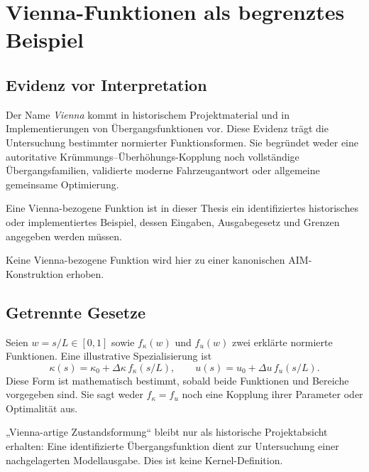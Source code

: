 \chapter{Vienna-Funktionen als begrenztes Beispiel}
\label{chap:vienna-reinterpretation}

\section*{Evidenz vor Interpretation}

Der Name \emph{Vienna} kommt in historischem Projektmaterial und in
Implementierungen von Übergangsfunktionen vor. Diese Evidenz trägt die
Untersuchung bestimmter normierter Funktionsformen. Sie begründet weder eine
autoritative Krümmungs--Überhöhungs-Kopplung noch vollständige
Übergangsfamilien, validierte moderne Fahrzeugantwort oder allgemeine
gemeinsame Optimierung.

\begin{principle}
\label{princ:vienna-reinterpretation}
Eine Vienna-bezogene Funktion ist in dieser Thesis ein identifiziertes
historisches oder implementiertes Beispiel, dessen Eingaben, Ausgabegesetz
und Grenzen angegeben werden müssen.
\end{principle}

\begin{principle}
\label{princ:vienna-no-special-curve}
Keine Vienna-bezogene Funktion wird hier zu einer kanonischen
AIM-Konstruktion erhoben.
\end{principle}

\section{Getrennte Gesetze}

Seien \(w=s/L\in[0,1]\) sowie \(f_\kappa(w)\) und \(f_u(w)\) zwei erklärte
normierte Funktionen. Eine illustrative Spezialisierung ist
\[
\kappa(s)=\kappa_0+\Delta\kappa\,f_\kappa(s/L),
\qquad
u(s)=u_0+\Delta u\,f_u(s/L).
\]
Diese Form ist mathematisch bestimmt, sobald beide Funktionen und Bereiche
vorgegeben sind. Sie sagt weder \(f_\kappa=f_u\) noch eine Kopplung ihrer
Parameter oder Optimalität aus.

\begin{definition}
\label{def:vienna-state-shaping}
„Vienna-artige Zustandsformung“ bleibt nur als historische Projektabsicht
erhalten: Eine identifizierte Übergangsfunktion dient zur Untersuchung einer
nachgelagerten Modellausgabe. Dies ist keine Kernel-Definition.
\end{definition}

